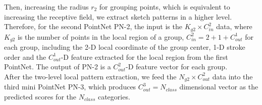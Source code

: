 Then, increasing the radius $r_2$ for grouping points, which is equivalent to increasing the receptive field, we extract sketch patterns in a higher level.
%
Therefore, for the second PointNet PN-2, the input is the $K_{g2} \times C^2_{in}$ data, where $K_{g2}$ is the number of points in the local region of a group, $C^2_{in}=2+1+C^1_{out}$ for each group, including the 2-D local coordinate of the group center, 1-D stroke order and the $C^1_{out}$-D feature extracted for the local region from the first PointNet.
%
The output of PN-2 is a $C^2_{out}$-D feature vector for each group.
\\

After the two-level local pattern extraction, we feed the $N_{g2} \times C^2_{out}$ data into the third mini PointNet PN-3, which produces $C^{3}_{out}=N_{class}$ dimensional vector as the predicted scores for the $N_{class}$ categories.





